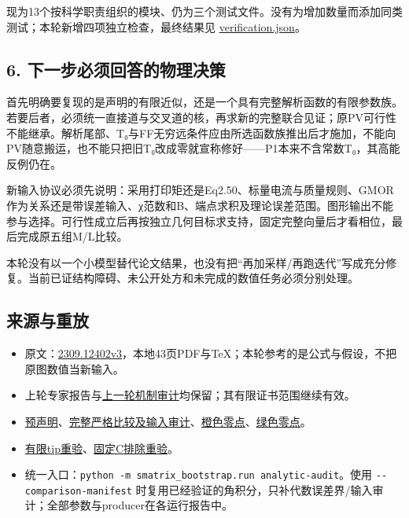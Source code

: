 \documentclass[
  11pt,
  a4paper,
]{article}
\providecommand{\tightlist}{%
  \setlength{\itemsep}{0pt}\setlength{\parskip}{0pt}}
\begin{document}
现为13个按科学职责组织的模块、仍为三个测试文件。没有为增加数量而添加同类测试；本轮新增四项独立检查，最终结果见
\url{verification.json}。

\subsection{6.
下一步必须回答的物理决策}\label{ux4e0bux4e00ux6b65ux5fc5ux987bux56deux7b54ux7684ux7269ux7406ux51b3ux7b56}

首先明确要复现的是声明的有限近似，还是一个具有完整解析函数的有限参数族。若要后者，必须统一直接道与交叉道的核，再求新的完整联合见证；原PV可行性不能继承。解析尾部、T₀与FF无穷远条件应由所选函数族推出后才施加，不能向PV随意搬运，也不能只把旧T₀改成零就宣称修好------P1本来不含常数T₀，其高能反例仍在。

新输入协议必须先说明：采用打印矩还是Eq2.50、标量电流与质量规则、GMOR作为关系还是带误差输入、χ范数和B、端点求积及理论误差范围。图形输出不能参与选择。可行性成立后再按独立几何目标求支持，固定完整向量后才看相位，最后完成原五组M/L比较。

本轮没有以一个小模型替代论文结果，也没有把``再加采样/再跑迭代''写成充分修复。当前已证结构障碍、未公开处方和未完成的数值任务必须分别处理。

\subsection{来源与重放}\label{ux6765ux6e90ux4e0eux91cdux653e}

\begin{itemize}
\tightlist
\item
  原文：\href{https://arxiv.org/html/2309.12402v3}{2309.12402v3}，本地43页PDF与TeX；本轮参考的是公式与假设，不把原图数值当新输入。
\item
  上轮专家报告与\href{../expert_response_20260910/RHO_MECHANISM_AUDIT_ZH.md}{上一轮机制审计}均保留；其有限证书范围继续有效。
\item
  \href{AUDIT_PLAN.json}{预声明}、\href{verified_analytic_audit/analytic_audit.json}{完整严格比较及输入审计}、\href{C1_orange_root/evaluation.json}{橙色零点}、\href{C1_green_root/evaluation.json}{绿色零点}。
\item
  \href{finite_tip_recheck/report.json}{有限tip重验}、\href{finite_C_exclusion_recheck/report.json}{固定C排除重验}。
\item
  统一入口：\texttt{python\ -m\ smatrix\_bootstrap.run\ analytic-audit}。使用
  \texttt{-\/-comparison-manifest}
  时复用已经验证的角积分，只补代数误差界/输入审计；全部参数与producer在各运行报告中。
\end{itemize}
\end{document}
